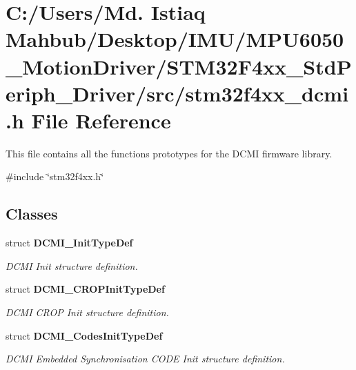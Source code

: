 \section{C\+:/\+Users/\+Md. Istiaq Mahbub/\+Desktop/\+I\+M\+U/\+M\+P\+U6050\+\_\+\+Motion\+Driver/\+S\+T\+M32\+F4xx\+\_\+\+Std\+Periph\+\_\+\+Driver/src/stm32f4xx\+\_\+dcmi.h File Reference}
\label{stm32f4xx__dcmi_8h}


This file contains all the functions prototypes for the D\+C\+MI firmware library.  


{\ttfamily \#include \char`\"{}stm32f4xx.\+h\char`\"{}}\newline
\subsection*{Classes}
\begin{DoxyCompactItemize}
\item 
struct \textbf{ D\+C\+M\+I\+\_\+\+Init\+Type\+Def}
\begin{DoxyCompactList}\small\item\em D\+C\+MI Init structure definition. \end{DoxyCompactList}\item 
struct \textbf{ D\+C\+M\+I\+\_\+\+C\+R\+O\+P\+Init\+Type\+Def}
\begin{DoxyCompactList}\small\item\em D\+C\+MI C\+R\+OP Init structure definition. \end{DoxyCompactList}\item 
struct \textbf{ D\+C\+M\+I\+\_\+\+Codes\+Init\+Type\+Def}
\begin{DoxyCompactList}\small\item\em D\+C\+MI Embedded Synchronisation C\+O\+DE Init structure definition. \end{DoxyCompactList}\end{DoxyCompactItemize}
